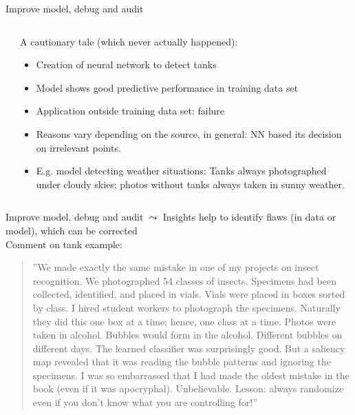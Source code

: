 \documentclass[11pt,compress,t,notes=noshow, aspectratio=169, xcolor=table]{beamer}
\begin{document}
\begin{frame}{Improve model, debug and audit}
\begin{columns}[T, totalwidth = \textwidth]
\begin{column}{0.44\textwidth}
	\end{column}
	\begin{column}{0.54\textwidth}
    A cautionary tale (which never actually happened):
	\begin{itemize}
	    \item Creation of neural network to detect tanks
        \item Model shows good predictive performance in training data set
        \item Application outside training data set: failure
        \item<2-> Reasons vary depending on the source, in general: NN based its decision on irrelevant points. 
        \item<3-> E.g. model detecting weather situations: Tanks always photographed under cloudy skies; photos without tanks always taken in sunny weather.
	\end{itemize}

	\end{column}
	\end{columns}

\end{frame}

\begin{frame}{Improve model, debug and audit}
$\leadsto$ Insights help to identify flaws (in data or model), which can be corrected \\
\vspace{0.9cm}
	\centering
    Comment on tank example: \\
    \medskip
    \begin{quote}
        ''We made exactly the same mistake in one of my projects on insect recognition. We photographed 54 classes of insects. Specimens had been collected, identified, and placed in vials. Vials were placed in boxes sorted by class. I hired student workers to photograph the specimens. Naturally they did this one box at a time; hence, one class at a time. Photos were taken in alcohol. Bubbles would form in the alcohol. Different bubbles on different days. The learned classifier was surprisingly good. But a saliency map revealed that it was reading the bubble patterns and ignoring the specimens. I was so embarrassed that I had made the oldest mistake in the book (even if it was apocryphal). Unbelievable. Lesson: always randomize even if you don’t know what you are controlling for!''
    \end{quote}
 \end{frame}
\end{document}
